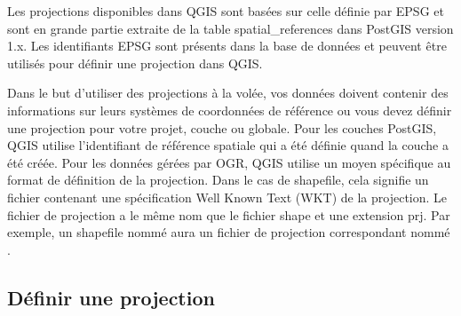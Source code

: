 Les projections disponibles dans QGIS sont bas\'ees sur celle d\'efinie par
EPSG et sont en grande partie extraite de la table
spatial\_references dans PostGIS version 1.x. Les identifiants
EPSG sont pr\'esents dans la base de donn\'ees et peuvent \^etre utilis\'es pour d\'efinir
une projection dans QGIS.

Dans le but d'utiliser des projections \`a la vol\'ee, vos donn\'ees doivent contenir
des informations sur leurs syst\`emes de coordonn\'ees de r\'ef\'erence ou vous devez
d\'efinir une projection pour votre projet, couche ou globale. Pour les couches
PostGIS, QGIS utilise l'identifiant de r\'ef\'erence spatiale qui a \'et\'e d\'efinie
quand la couche a \'et\'e cr\'e\'ee. Pour les donn\'ees g\'er\'ees par OGR, QGIS utilise un
moyen sp\'ecifique au format de d\'efinition de la projection. Dans le cas de
shapefile, cela signifie un fichier contenant une sp\'ecification Well Known Text
(WKT) de la projection. Le fichier de projection a le m\^eme nom que
le fichier shape et une extension prj. Par exemple, un shapefile nomm\'e
 aura un fichier de projection correspondant nomm\'e
.

\subsection{D\'efinir une projection}
\label{sec:projection-specifying}

